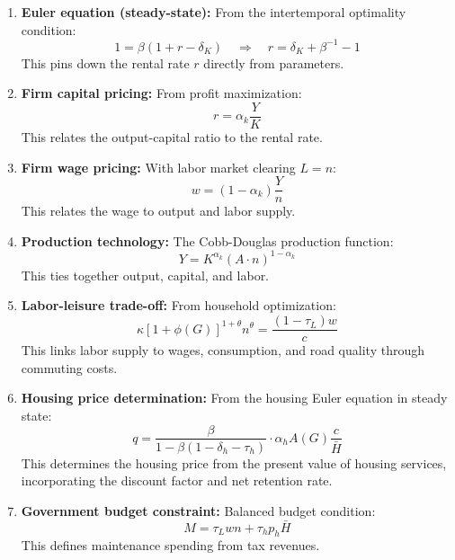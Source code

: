 \begin{enumerate}
    \item \textbf{Euler equation (steady-state):} From the intertemporal optimality condition:
    \begin{equation}
    1 = \beta(1 + r - \delta_K) \quad \Rightarrow \quad r = \delta_K + \beta^{-1} - 1
    \end{equation}
    This pins down the rental rate $r$ directly from parameters.

    \item \textbf{Firm capital pricing:} From profit maximization:
    \begin{equation}
    r = \alpha_k \frac{Y}{K}
    \end{equation}
    This relates the output-capital ratio to the rental rate.

    \item \textbf{Firm wage pricing:} With labor market clearing $L = n$:
    \begin{equation}
    w = (1-\alpha_k) \frac{Y}{n}
    \end{equation}
    This relates the wage to output and labor supply.

    \item \textbf{Production technology:} The Cobb-Douglas production function:
    \begin{equation}
    Y = K^{\alpha_k}(A \cdot n)^{1-\alpha_k}
    \end{equation}
    This ties together output, capital, and labor.

    \item \textbf{Labor-leisure trade-off:} From household optimization:
    \begin{equation}
    \kappa [1+\phi(G)]^{1+\theta} n^\theta = \frac{(1-\tau_L)w}{c}
    \end{equation}
    This links labor supply to wages, consumption, and road quality through commuting costs.

    \item \textbf{Housing price determination:} From the housing Euler equation in steady state:
    \begin{equation}
    q = \frac{\beta}{1-\beta(1-\delta_h-\tau_h)} \cdot \alpha_h A(G) \frac{c}{\bar{H}}
    \end{equation}
    This determines the housing price from the present value of housing services, incorporating the discount factor and net retention rate.

    \item \textbf{Government budget constraint:} Balanced budget condition:
    \begin{equation}
    M = \tau_L w n + \tau_h p_h \bar{H}
    \end{equation}
    This defines maintenance spending from tax revenues.


\end{enumerate}
